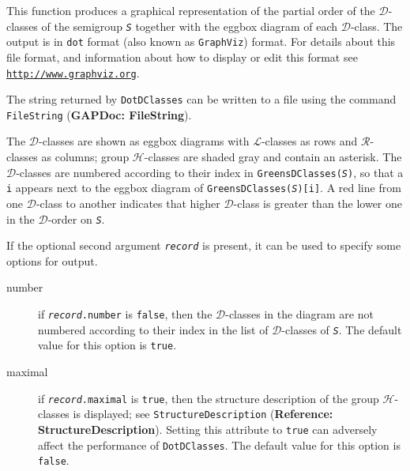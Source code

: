 \documentclass[a4paper,11pt]{report}
\begin{document}
{{{ This function produces a graphical representation of the partial order of the $\mathcal{D}$-classes of the semigroup \mbox{\texttt{\mdseries\slshape S}} together with the eggbox diagram of each $\mathcal{D}$-class. The output is in \texttt{dot} format (also known as \texttt{GraphViz}) format. For details about this file format, and information about how to
display or edit this format see \href{http://www.graphviz.org} {\texttt{http://www.graphviz.org}}. 

 The string returned by \texttt{DotDClasses} can be written to a file using the command \texttt{FileString} (\textbf{GAPDoc: FileString}).

 The $\mathcal{D}$-classes are shown as eggbox diagrams with $\mathcal{L}$-classes as rows and $\mathcal{R}$-classes as columns; group $\mathcal{H}$-classes are shaded gray and contain an asterisk. The $\mathcal{D}$-classes are numbered according to their index in \texttt{GreensDClasses(\mbox{\texttt{\mdseries\slshape S}})}, so that a \texttt{i} appears next to the eggbox diagram of \texttt{GreensDClasses(\mbox{\texttt{\mdseries\slshape S}})[i]}. A red line from one $\mathcal{D}$-class to another indicates that higher $\mathcal{D}$-class is greater than the lower one in the $\mathcal{D}$-order on \mbox{\texttt{\mdseries\slshape S}}. 

 If the optional second argument \mbox{\texttt{\mdseries\slshape record}} is present, it can be used to specify some options for output. 
\begin{description}
\item[{number}]  if \texttt{\mbox{\texttt{\mdseries\slshape record}}.number} is \texttt{false}, then the $\mathcal{D}$-classes in the diagram are not numbered according to their index in the list
of $\mathcal{D}$-classes of \mbox{\texttt{\mdseries\slshape S}}. The default value for this option is \texttt{true}. 
\item[{maximal}]  if \texttt{\mbox{\texttt{\mdseries\slshape record}}.maximal} is \texttt{true}, then the structure description of the group $\mathcal{H}$-classes is displayed; see \texttt{StructureDescription} (\textbf{Reference: StructureDescription}). Setting this attribute to \texttt{true} can adversely affect the performance of \texttt{DotDClasses}. The default value for this option is \texttt{false}. 
\end{description}
 
}}}
\end{document}
